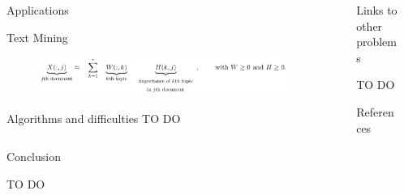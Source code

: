 \documentclass[final]{beamer}
\newlength{\sepwid}
\newlength{\onecolwid}
\newlength{\twocolwid}
\newlength{\threecolwid}
\begin{document}
\begin{frame}
\begin{columns}[t]
\begin{column}{\threecolwid}
\begin{columns}[t]
\begin{column}{\twocolwid}
\begin{exampleblock}{Applications}
\begin{block}{Text Mining}
\begin{itemize}
\end{itemize}
\begin{figure}
    \centering
    \includegraphics{presentation/NMF_app2.png}
\end{figure}
\end{block}

\end{exampleblock}

\begin{exampleblock}{Algorithms and difficulties}
TO DO
\end{exampleblock}

\end{column} %

\end{columns}

\begin{alertblock}{Conclusion}

TO DO

\end{alertblock}


\end{column}
\begin{column}{\sepwid}\end{column} %
\begin{column}{\onecolwid} %


\begin{exampleblock}{Links to other problems}

TO DO
\end{exampleblock}

\begin{alertblock}{References}

\begin{thebibliography}{99}
\end{thebibliography}

\end{alertblock}
\end{column} %
\begin{column}{\sepwid}\end{column} %
\end{columns} %
\end{frame} %
\end{document}
